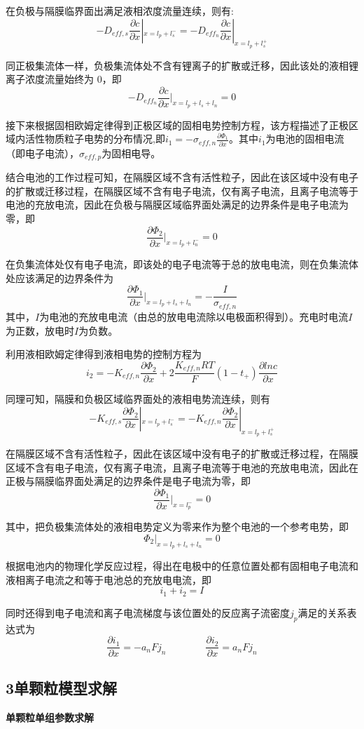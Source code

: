 \documentclass[12pt]{ctexart}%
\begin{document}
在负极与隔膜临界面出满足液相浓度流量连续，则有:
$$-D_{eff,s}\frac{\partial c}{\partial x}|_{x=l_p+l_s^-} = -D_{eff_n}\frac{\partial c}{\partial x}|_{x=l_p+l_s^+}$$

同正极集流体一样，负极集流体处不含有锂离子的扩散或迁移，因此该处的液相锂离子浓度流量始终为 0，即
$$-D_{eff_n}\frac{\partial c}{\partial x}|_{x=l_p+l_s+l_n} = 0$$

接下来根据固相欧姆定律得到正极区域的固相电势控制方程，该方程描述了正极区域内活性物质粒子电势的分布情况,即$i_1 = -\sigma_{eff,n}\frac{\partial \Phi_1}{\partial x}$。其中$i_1$为电池的固相电流（即电子电流），$\sigma_{eff,p}$为固相电导。

结合电池的工作过程可知，在隔膜区域不含有活性粒子，因此在该区域中没有电子的扩散或迁移过程，在隔膜区域不含有电子电流，仅有离子电流，且离子电流等于电池的充放电流，因此在负极与隔膜区域临界面处满足的边界条件是电子电流为零，即
$$\frac{\partial \Phi_2}{\partial x}|_{x=l_p+l_n^-} = 0$$

在负集流体处仅有电子电流，即该处的电子电流等于总的放电电流，则在负集流体处应该满足的边界条件为
$$\frac{\partial \Phi_1}{\partial x}|_{x=l_p+l_s+l_n} = -\frac{I}{\sigma_{eff,n}}$$
其中，$I$为电池的充放电电流（由总的放电电流除以电极面积得到）。充电时电流$I$为正数，放电时$I$为负数。

利用液相欧姆定律得到液相电势的控制方程为
$$i_2 = -K_{eff,n}\frac{\partial \Phi_2}{\partial x} + 2\frac{K_{eff,n}RT}{F}(1-t_+)\frac{\partial ln c}{\partial x}$$

同理可知，隔膜和负极区域临界面处的液相电势流连续，则有
$$-K_{eff,s}\frac{\partial \Phi_2}{\partial x}|_{x=l_p+l^-_s} = -K_{eff,n}\frac{\partial \Phi_2}{\partial x}|_{x=l_p+l^+_s}$$

在隔膜区域不含有活性粒子，因此在该区域中没有电子的扩散或迁移过程，在隔膜区域不含有电子电流，仅有离子电流，且离子电流等于电池的充放电电流，因此在正极与隔膜临界面处满足的边界条件是电子电流为零，即
$$\frac{\partial \Phi_1}{\partial x}|_{x=l_p^-} = 0$$

其中，把负极集流体处的液相电势定义为零来作为整个电池的一个参考电势，即
$$\Phi_2|_{x=l_p+l_s+l_n} = 0$$

根据电池内的物理化学反应过程，得出在电极中的任意位置处都有固相电子电流和液相离子电流之和等于电池总的充放电电流，即
$$i_1+i_2=I$$

同时还得到电子电流和离子电流梯度与该位置处的反应离子流密度$j_p$满足的关系表达式为
$$\frac{\partial i_1}{\partial x} = -a_nFj_n \qquad \qquad     \frac{\partial i_2}{\partial x} = a_nFj_n$$

\subsection{3单颗粒模型求解}
\noindent\textbf{单颗粒单组参数求解}
\end{document}
